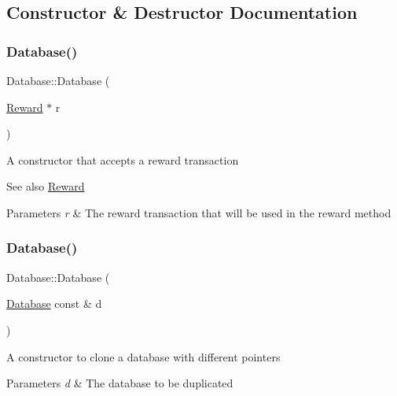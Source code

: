 \subsection{Constructor \& Destructor Documentation}
\mbox{\label{classDatabase_ab00a6ec54927a6a80f5c09a926ee4611}} 
\subsubsection{\texorpdfstring{Database()}{Database()}\hspace{0.1cm}{\footnotesize\ttfamily [1/2]}}
{\footnotesize\ttfamily Database\+::\+Database (\begin{DoxyParamCaption}\item[{\mbox{\hyperlink{classReward}{Reward}} $\ast$}]{r }\end{DoxyParamCaption})\hspace{0.3cm}{\ttfamily [explicit]}}

A constructor that accepts a reward transaction \begin{DoxySeeAlso}{See also}
\mbox{\hyperlink{classReward}{Reward}}
\end{DoxySeeAlso}

\begin{DoxyParams}{Parameters}
{\em r} & The reward transaction that will be used in the reward method \\
\hline
\end{DoxyParams}
\mbox{\label{classDatabase_ab366035be8ad9836454da24f4a5e27ed}} 
\subsubsection{\texorpdfstring{Database()}{Database()}\hspace{0.1cm}{\footnotesize\ttfamily [2/2]}}
{\footnotesize\ttfamily Database\+::\+Database (\begin{DoxyParamCaption}\item[{\mbox{\hyperlink{classDatabase}{Database}} const \&}]{d }\end{DoxyParamCaption})}

A constructor to clone a database with different pointers


\begin{DoxyParams}{Parameters}
{\em d} & The database to be duplicated \\
\hline
\end{DoxyParams}


